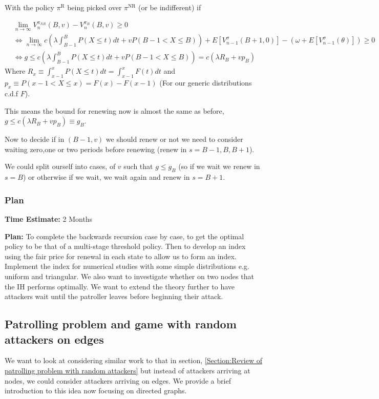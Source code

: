 \documentclass[a4paper,10pt]{article}
\theoremstyle{definition}
\theoremstyle{definition}
\theoremstyle{remark}
\theoremstyle{definition}
\begin{document}
With the policy $\pi^{\text{R}}$ being picked over $\pi^{\text{NR}}$ (or be indifferent) if

\begin{align*}
&\lim\limits_{n \rightarrow \infty} V_{n}^{\pi_{NR}} (B,v) - V_{n}^{\pi_{R}}(B,v) \geq 0 \\
& \iff \lim\limits_{n \rightarrow \infty} c (\lambda \int_{B-1}^{B} P(X \leq t ) dt + v P(B-1 < X \leq B)) + E[V_{n-1}^{\sigma}(B+1,0)] - (\omega + E[V_{n-1}^{\sigma}(\theta)]) \geq 0 \\
& \iff g \leq c (\lambda \int_{B-1}^{B} P(X \leq t ) dt +v P(B-1 < X \leq B)) = c( \lambda R_{B} + v p_{B})
\end{align*}
Where $R_{x} \equiv \int_{x-1}^{x} P(X \leq t ) dt = \int_{x-1}^{x} F(t) dt$ and $p_{x} \equiv P(x-1 < X \leq x) = F(x)-F(x-1)$ (For our generic distributions c.d.f $F$).

This means the bound for renewing now is almost the same as before, $g \leq c (\lambda R_{B} + v p_{B}) \equiv g_{B}$.

Now to decide if in $(B-1,v)$ we should renew or not we need to consider waiting zero,one or two periods before renewing (renew in $s=B-1,B,B+1$).

We could split ourself into cases, of $v$ such that $g \leq g_{B}$ (so if we wait we renew in $s=B$) or otherwise if we wait, we wait again and renew in $s=B+1$.

\subsubsection{Plan}
\textbf{Time Estimate:} 2 Months

\textbf{Plan:} To complete the backwards recursion case by case, to get the optimal policy to be that of a multi-stage threshold policy. Then to develop an index using the fair price for renewal in each state to allow us to form an index. Implement the index for numerical studies with some simple distributions e.g. uniform and triangular. We also want to investigate whether on two nodes that the IH performs optimally. We want to extend the theory further to have attackers wait until the patroller leaves before beginning their attack. 

\subsection{Patrolling problem and game with random attackers on edges}
We want to look at considering similar work to that in section, \ref{Section:Review of patrolling problem with random attackers} but instead of attackers arriving at nodes, we could consider attackers arriving on edges. We provide a brief introduction to this idea now focusing on directed graphs.
\end{document}
